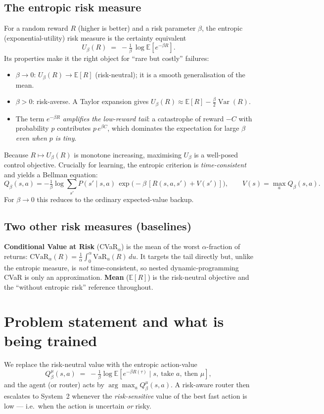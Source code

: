 \documentclass[11pt]{article}
\newcommand{\Ubeta}{U_{\beta}}
\newcommand{\E}{\mathbb{E}}
\begin{document}
\subsection{The entropic risk measure}
For a random reward $R$ (higher is better) and a risk parameter $\beta$, the
entropic (exponential-utility) risk measure is the certainty equivalent
\begin{equation}
\Ubeta(R) \;=\; -\tfrac{1}{\beta}\,\log \E\!\left[e^{-\beta R}\right].
\end{equation}
Its properties make it the right object for ``rare but costly'' failures:
\begin{itemize}[nosep]
\item $\beta \to 0$: $\Ubeta(R)\to \E[R]$ (risk-neutral); it is a smooth
  generalisation of the mean.
\item $\beta>0$: risk-averse. A Taylor expansion gives
  $\Ubeta(R)\approx \E[R]-\tfrac{\beta}{2}\operatorname{Var}(R)$.
\item The term $e^{-\beta R}$ \emph{amplifies the low-reward tail}: a catastrophe
  of reward $-C$ with probability $p$ contributes $p\,e^{\beta C}$, which dominates
  the expectation for large $\beta$ \emph{even when $p$ is tiny}.
\end{itemize}
Because $R\mapsto \Ubeta(R)$ is monotone increasing, maximising $\Ubeta$ is a
well-posed control objective. Crucially for learning, the entropic criterion is
\emph{time-consistent} and yields a Bellman equation:
\begin{equation}
Q_\beta(s,a) = -\tfrac{1}{\beta}\log \sum_{s'}P(s'\!\mid s,a)\,
   \exp\!\big(-\beta\,[R(s,a,s')+V(s')]\big),\qquad
V(s)=\max_a Q_\beta(s,a).
\label{eq:entropic-bellman}
\end{equation}
For $\beta\to 0$ this reduces to the ordinary expected-value backup.

\subsection{Two other risk measures (baselines)}
\textbf{Conditional Value at Risk} (CVaR$_\alpha$) is the mean of the worst
$\alpha$-fraction of returns: $\mathrm{CVaR}_\alpha(R)=\tfrac1\alpha\int_0^\alpha
\mathrm{VaR}_u(R)\,du$. It targets the tail directly but, unlike the entropic
measure, is \emph{not} time-consistent, so nested dynamic-programming CVaR is only
an approximation. \textbf{Mean} ($\E[R]$) is the risk-neutral objective and the
``without entropic risk'' reference throughout.

\section{Problem statement and what is being trained}
We replace the risk-neutral value with the entropic action-value
\begin{equation}
Q^{\mu}_\beta(s,a) \;=\; -\tfrac1\beta \log
   \E\!\left[e^{-\beta R(\tau)} \mid s,\ \text{take }a,\ \text{then }\mu\right],
\end{equation}
and the agent (or router) acts by $\arg\max_a Q^\mu_\beta(s,a)$. A risk-aware
router then escalates to System~2 whenever the \emph{risk-sensitive} value of the
best fast action is low --- i.e.\ when the action is uncertain \emph{or} risky.
\end{document}
